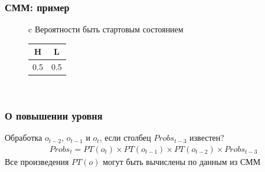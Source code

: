 \documentclass{beamer}
\begin{document}
\begin{frame}[fragile]
	\frametitle{СММ: пример}
	\centering
\begin{figure}
	\label{fig:HMM}
\end{figure}
\begin{figure}
	\begin{tabular}{c}
		Вероятности быть стартовым состоянием\\
		\begin{tabular}{|c|c|}
			\hline
			H & L \\
			\hline
			0.5 & 0.5 \\
			\hline
		\end{tabular} \\
	\end{tabular}
\end{figure}
\end{frame}


\begin{frame}
	\frametitle{О повышении уровня}
	Обработка $o_{t-2}$, $o_{t-1}$ и $o_t$, если столбец $Probs_{t-3}$ известен?
	\vfill
\begin{align}
  \mathit{Probs}_{t} = \mathit{PT}(o_t) \times \mathit{PT}(o_{t-1}) \times \mathit{PT}(o_{t-2}) \times \mathit{Probs}_{t - 3} 
\label{lvl_3}
\end{align}
	\vfill
	Все произведения $PT(o)$ могут быть вычислены по данным из СММ
\end{frame}
\end{document}
